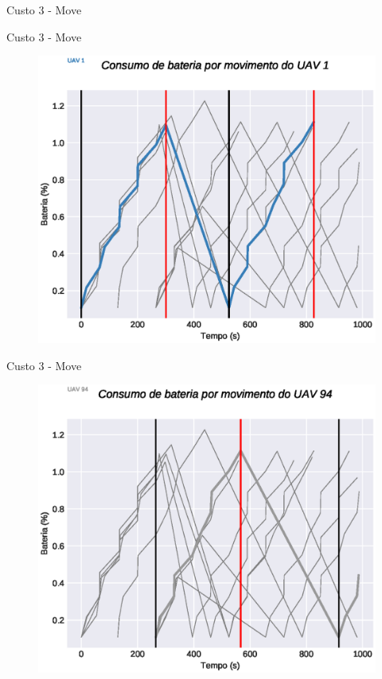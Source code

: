 \begin{frame}{Custo 3 - Move}
\begin{figure}[!htb]
                 \end{figure}
            \end{frame}\begin{frame}{Custo 3 - Move}
                \begin{figure}[!htb]
                     \includegraphics[width=\textwidth]{custo_3/uav_move_acum_uav_1.eps}
                 \end{figure}
            \end{frame}\begin{frame}{Custo 3 - Move}
                \begin{figure}[!htb]
                     \includegraphics[width=\textwidth]{custo_3/uav_move_acum_uav_8.eps}

\end{figure}
\end{frame}
